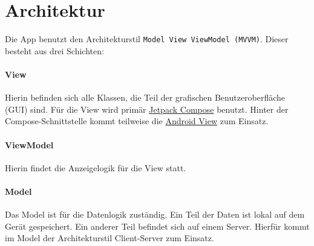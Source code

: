 \section{Architektur}
Die App benutzt den Architekturstil \texttt{Model View ViewModel (MVVM)}. Dieser besteht aus drei Schichten:

\paragraph*{View}\label{App_View}
Hierin befinden sich alle Klassen, die Teil der grafischen Benutzeroberfläche (GUI) sind. 
Für die View wird primär \href{https://developer.android.com/jetpack/compose}{Jetpack Compose} benutzt. 
Hinter der Compose-Schnittstelle kommt teilweise die \href{https://developer.android.com/reference/android/view/View}{Android View} zum Einsatz.

\paragraph*{ViewModel}\label{App_ViewModel}
Hierin findet die Anzeigelogik für die View statt.

\paragraph*{Model}\label{App_Model}
Das Model ist für die Datenlogik zuständig. Ein Teil der Daten ist lokal auf dem Gerät gespeichert. 
Ein anderer Teil befindet sich auf einem Server. Hierfür kommt im Model der Architekturstil Client-Server zum Einsatz.
